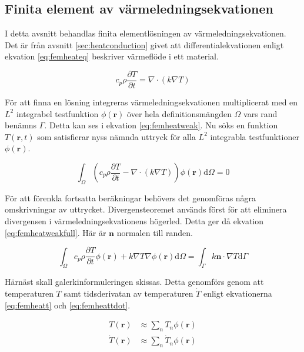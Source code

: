 \subsection{Finita element av värmeledningsekvationen}
\label{sec:femheat}
I detta avsnitt behandlas finita elementlösningen av värmeledningsekvationen.
Det är från avsnitt \ref{sec:heatconduction} givet att differentialekvationen
enligt ekvation \eqref{eq:femheateq} beskriver värmeflöde i ett material.

\begin{equation}
\label{eq:femheateq}
c_p\rho\frac{\partial T}{\partial t} = \nabla\cdot(k\nabla T)
\end{equation}

\noindent
För att finna en lösning integreras värmeledningsekvationen
multiplicerat med en $L^2$ integrabel testfunktion $\phi(\mathbf{r})$ över hela
definitionsmängden $\Omega$ vars rand benämns $\Gamma$.
Detta kan ses i ekvation \eqref{eq:femheatweak}.
Nu söks en funktion $T(\mathbf{r},t)$ som satisfierar nyss nämnda uttryck för
alla $L^2$ integrabla testfunktioner $\phi(\mathbf{r})$.

\begin{equation}
\label{eq:femheatweak}
\int_\Omega \left(c_p\rho\frac{\partial T}{\partial t} -
\nabla\cdot(k\nabla T)\right)\phi(\mathbf{r})\mathrm{d}\Omega = 0
\end{equation}

\noindent
För att förenkla fortsatta beräkningar behövers det genomföras några
omskrivningar av uttrycket. Divergensteoremet används först för att 
eliminera divergensen i värmeledningsekvationens högerled. Detta ger då
ekvation \eqref{eq:femheatweakfull}. Här är $\mathbf{n}$ normalen till randen.

\begin{equation}
\label{eq:femheatweakfull}
\int_\Omega c_p\rho\frac{\partial T}{\partial t}\phi(\mathbf{r}) +
k\nabla T\nabla\phi(\mathbf{r}) \mathrm{d}\Omega =
\int_\Gamma k\mathbf{n}\cdot\nabla T\mathrm{d}\Gamma
\end{equation}

\noindent
Härnäst skall galerkinformuleringen skissas. Detta genomförs
genom att temperaturen $T$ samt tidsderivatan av temperaturen $\dot{T}$
enligt ekvationerna \eqref{eq:femheatt} och \eqref{eq:femheattdot}.

\begin{align}
\label{eq:femheatt}
T(\mathbf{r}) & \approx \sum_n T_n\phi(\mathbf{r}) \\
\label{eq:femheattdot}
\dot{T}(\mathbf{r}) & \approx \sum_n \dot{T}_n\phi(\mathbf{r})
\end{align}

